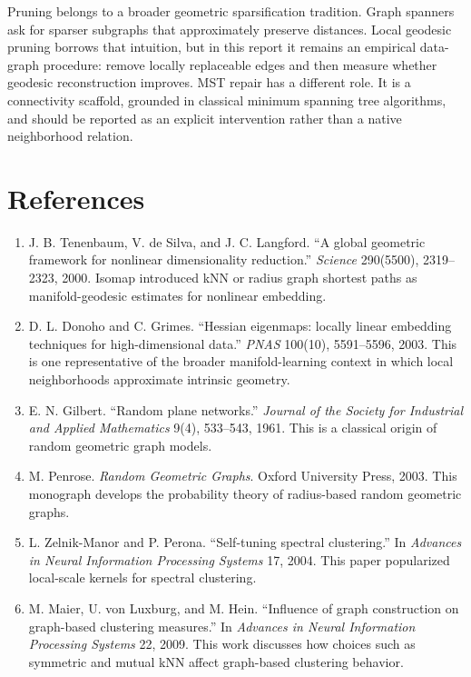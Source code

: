 \documentclass[11pt]{article}
\begin{document}
Pruning belongs to a broader geometric sparsification tradition.  Graph spanners ask for
sparser subgraphs that approximately preserve distances.  Local geodesic pruning borrows
that intuition, but in this report it remains an empirical data-graph procedure: remove
locally replaceable edges and then measure whether geodesic reconstruction improves.  MST
repair has a different role.  It is a connectivity scaffold, grounded in classical minimum
spanning tree algorithms, and should be reported as an explicit intervention rather than a
native neighborhood relation.

\section*{References}

\begin{enumerate}[leftmargin=2em]
  \item J. B. Tenenbaum, V. de Silva, and J. C. Langford. ``A global geometric
  framework for nonlinear dimensionality reduction.'' \emph{Science} 290(5500),
  2319--2323, 2000.  Isomap introduced kNN or radius graph shortest paths as
  manifold-geodesic estimates for nonlinear embedding.

  \item D. L. Donoho and C. Grimes. ``Hessian eigenmaps: locally linear embedding
  techniques for high-dimensional data.'' \emph{PNAS} 100(10), 5591--5596, 2003.
  This is one representative of the broader manifold-learning context in which local
  neighborhoods approximate intrinsic geometry.

  \item E. N. Gilbert. ``Random plane networks.'' \emph{Journal of the Society for
  Industrial and Applied Mathematics} 9(4), 533--543, 1961.  This is a classical
  origin of random geometric graph models.

  \item M. Penrose. \emph{Random Geometric Graphs}. Oxford University Press, 2003.
  This monograph develops the probability theory of radius-based random geometric graphs.

  \item L. Zelnik-Manor and P. Perona. ``Self-tuning spectral clustering.'' In
  \emph{Advances in Neural Information Processing Systems} 17, 2004.  This paper
  popularized local-scale kernels for spectral clustering.

  \item M. Maier, U. von Luxburg, and M. Hein. ``Influence of graph construction on
  graph-based clustering measures.'' In \emph{Advances in Neural Information Processing
  Systems} 22, 2009.  This work discusses how choices such as symmetric and mutual kNN
  affect graph-based clustering behavior.


\end{enumerate}
\end{document}

